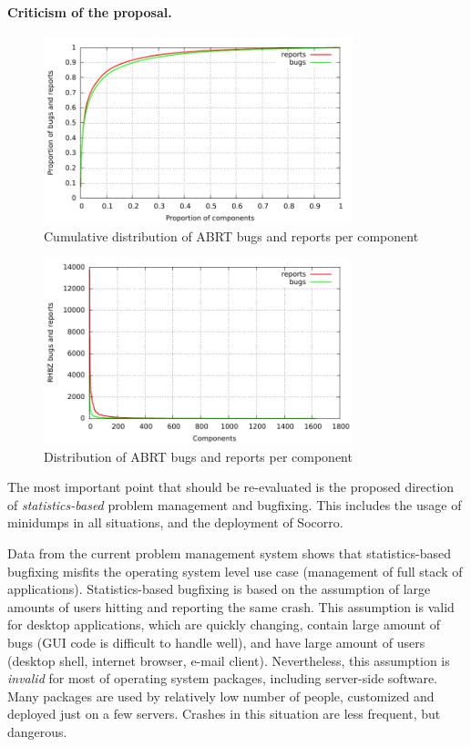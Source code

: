 \documentclass{article}
\begin{document}
\paragraph{Criticism of the proposal.}
\begin{figure}[h!]
\centering
\includegraphics[width=0.8\textwidth]{abrt-bugs-per-component-cdf.pdf}
\caption{Cumulative distribution of ABRT bugs and reports per
  component}
\label{fig:cumulative}
\end{figure}

\begin{figure}[h!]
\centering
\includegraphics[width=0.8\textwidth]{abrt-bugs-per-component.pdf}
\caption{Distribution of ABRT bugs and reports per component}
\label{fig:distribution}
\end{figure}

The most important point that should be re-evaluated is the proposed
direction of \emph{statistics-based} problem management and
bugfixing. This includes the usage of minidumps in all situations, and
the deployment of Socorro.

Data from the current problem management system shows that
statistics-based bugfixing misfits the operating system level use case
(management of full stack of applications).  Statistics-based
bugfixing is based on the assumption of large amounts of users hitting
and reporting the same crash.  This assumption is valid for desktop
applications, which are quickly changing, contain large amount of bugs
(GUI code is difficult to handle well), and have large amount of users
(desktop shell, internet browser, e-mail client).  Nevertheless, this
assumption is \emph{invalid} for most of operating system packages,
including server-side software. Many packages are used by relatively
low number of people, customized and deployed just on a few servers.
Crashes in this situation are less frequent, but dangerous.
\end{document}
